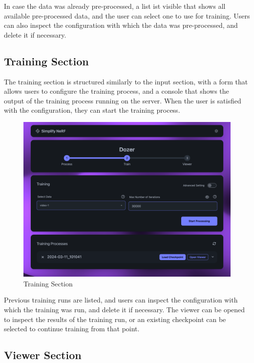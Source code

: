 In case the data was already pre-processed, a list ist visible that shows all available pre-processed data, and the user can select one to use for training.
Users can also inspect the configuration with which the data was pre-processed, and delete it if necessary.

\subsection*{Training Section}

The training section is structured similarly to the input section, with a form that allows users to configure the training process, and a console that shows the output of the training process running on the server.
When the user is satisfied with the configuration, they can start the training process.

\begin{figure}[htb]
  \includegraphics[width=\textwidth]{figures/view-train.png}
  \caption{Training Section}
  \label{fig:design:training-section}
\end{figure}


Previous training runs are listed, and users can inspect the configuration with which the training was run, and delete it if necessary. 
The viewer can be opened to inspect the results of the training run, or an existing checkpoint can be selected to continue training from that point.

\subsection*{Viewer Section}

